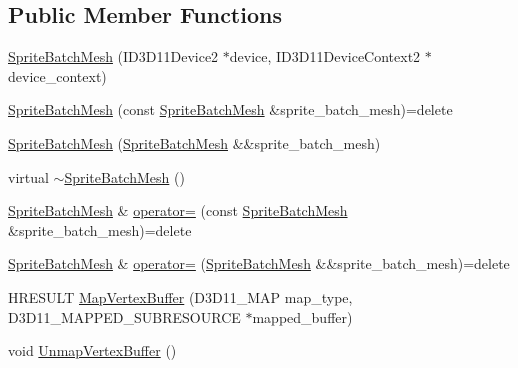 \subsection*{Public Member Functions}
\begin{DoxyCompactItemize}
\item 
\hyperlink{classmage_1_1_sprite_batch_mesh_a7664804b05d08b7126c3efedee5c2588}{Sprite\+Batch\+Mesh} (I\+D3\+D11\+Device2 $\ast$device, I\+D3\+D11\+Device\+Context2 $\ast$device\+\_\+context)
\item 
\hyperlink{classmage_1_1_sprite_batch_mesh_af86adf72834bd4a8b5b55af3e91bd339}{Sprite\+Batch\+Mesh} (const \hyperlink{classmage_1_1_sprite_batch_mesh}{Sprite\+Batch\+Mesh} \&sprite\+\_\+batch\+\_\+mesh)=delete
\item 
\hyperlink{classmage_1_1_sprite_batch_mesh_ae577b9b1f38ab5748c35675135da1e3e}{Sprite\+Batch\+Mesh} (\hyperlink{classmage_1_1_sprite_batch_mesh}{Sprite\+Batch\+Mesh} \&\&sprite\+\_\+batch\+\_\+mesh)
\item 
virtual \hyperlink{classmage_1_1_sprite_batch_mesh_a4f9ad5d0d58722499b9e7ddfac3312c9}{$\sim$\+Sprite\+Batch\+Mesh} ()
\item 
\hyperlink{classmage_1_1_sprite_batch_mesh}{Sprite\+Batch\+Mesh} \& \hyperlink{classmage_1_1_sprite_batch_mesh_ac6b9c2c79286f736d9a91a79cfa70044}{operator=} (const \hyperlink{classmage_1_1_sprite_batch_mesh}{Sprite\+Batch\+Mesh} \&sprite\+\_\+batch\+\_\+mesh)=delete
\item 
\hyperlink{classmage_1_1_sprite_batch_mesh}{Sprite\+Batch\+Mesh} \& \hyperlink{classmage_1_1_sprite_batch_mesh_a678700348ef43c46ed90d87d78c498de}{operator=} (\hyperlink{classmage_1_1_sprite_batch_mesh}{Sprite\+Batch\+Mesh} \&\&sprite\+\_\+batch\+\_\+mesh)=delete
\item 
H\+R\+E\+S\+U\+LT \hyperlink{classmage_1_1_sprite_batch_mesh_ab790dbbd3cb685c1f14d7ca1e9ed639b}{Map\+Vertex\+Buffer} (D3\+D11\+\_\+\+M\+AP map\+\_\+type, D3\+D11\+\_\+\+M\+A\+P\+P\+E\+D\+\_\+\+S\+U\+B\+R\+E\+S\+O\+U\+R\+CE $\ast$mapped\+\_\+buffer)
\item 
void \hyperlink{classmage_1_1_sprite_batch_mesh_a48ed983397a37a5874101b49c040b78c}{Unmap\+Vertex\+Buffer} ()
\end{DoxyCompactItemize}
